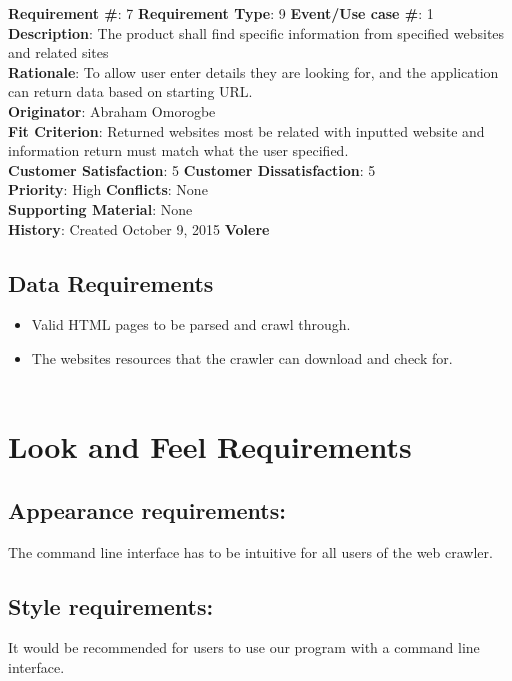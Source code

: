 \documentclass[titlepage]{article}
\begin{document}
\begin{framed}
\textbf{Requirement \#}: 7 \hfill \textbf{Requirement Type}: 9 \hfill\textbf{Event/Use case \#}: 1 \hfill\\
\textbf{Description}:  The product shall find specific information from specified websites and related sites\\
\textbf{Rationale}: To allow user enter details they are looking for, and the application can return data based on starting URL.\\
\textbf{Originator}: Abraham Omorogbe\\
\textbf{Fit Criterion}: Returned websites most be related with inputted website and information return must match what the user specified.\\
\textbf{Customer Satisfaction}: 5 \hfill 	\textbf{Customer Dissatisfaction}: 5 \hfill\\
\textbf{Priority}: High \hfill \textbf{Conflicts}: None \hfill 		\\
\textbf{Supporting Material}: None\\
\textbf{History}: Created October 9, 2015 \hfill	 \textbf{Volere}\hfill

\end{framed}

\subsection*{Data Requirements}
\begin{itemize}
  \item Valid HTML pages to be parsed and crawl through.
  \item The websites resources that the crawler can download and check for. \\ \\
\end{itemize}


\section{Look and Feel Requirements}

\subsection*{Appearance requirements:}  The command line interface has to be intuitive for all users of the web crawler.

\subsection*{Style requirements: }It would be recommended for users to use our program with a command line interface.
\end{document}
